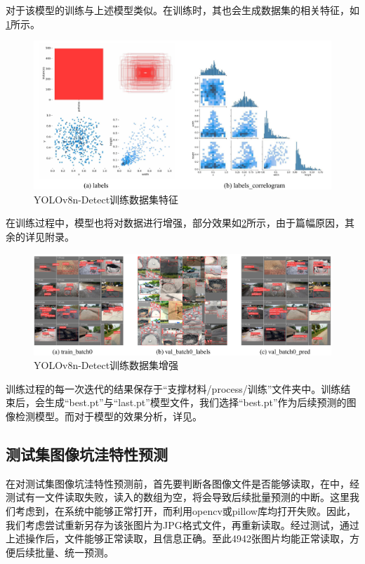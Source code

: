 \documentclass{MathorCupmodeling}
\begin{document}
\begin{itemize}
		对于该模型的训练与上述模型类似。在训练时，其也会生成数据集的相关特征，如\textcolor{blue}{\cref{fig:YOLOv8n-Detect训练数据集特征}}所示。
		\begin{figure}[H]
			\centering
			\includegraphics[scale=0.5]{Figures/detect/DetectLabels.pdf}
			\caption{YOLOv8n-Detect训练数据集特征}
			\label{fig:YOLOv8n-Detect训练数据集特征}
		\end{figure}

		在训练过程中，模型也将对数据进行增强，部分效果如\textcolor{blue}{\cref{fig:YOLOv8n-Detect训练数据集增强}}所示，由于篇幅原因，其余的详见附录。
		\begin{figure}[H]
			\centering
			\includegraphics[scale=0.5]{Figures/detect/Detect训练.pdf}
			\caption{YOLOv8n-Detect训练数据集增强}
			\label{fig:YOLOv8n-Detect训练数据集增强}
		\end{figure}

		训练过程的每一次迭代的结果保存于“支撑材料/process/训练”文件夹中。训练结束后，会生成“best.pt”与“last.pt”模型文件，我们选择“best.pt”作为后续预测的图像检测模型。而对于模型的效果分析，详见\textcolor{blue}{}。
	\end{itemize}
	\subsection{测试集图像坑洼特性预测}\label{预测}
	在对测试集图像坑洼特性预测前，首先要判断各图像文件是否能够读取，在\textcolor{blue}{}中，经测试有一文件读取失败，读入的数组为空，将会导致后续批量预测的中断。这里我们考虑到，在系统中能够正常打开，而利用opencv或pillow库均打开失败。因此，我们考虑尝试重新另存为该张图片为JPG格式文件，再重新读取。经过测试，通过上述操作后，文件能够正常读取，且信息正确。至此4942张图片均能正常读取，方便后续批量、统一预测。
\end{document}
